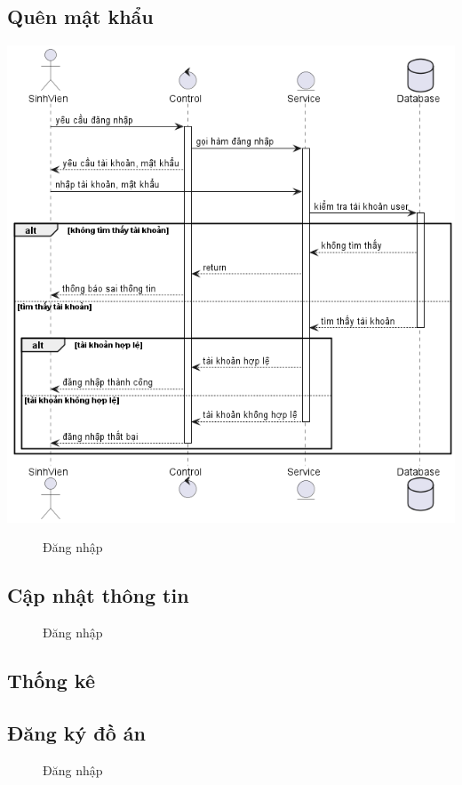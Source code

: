 \subsection{Quên mật khẩu}
  \begin{center}
    \includegraphics[width=1.1\textwidth]{image/sequence/login.png}
    \begin{figure}
      \centering
      \caption{Đăng nhập}
    \end{figure}
  \end{center}
\subsection{Cập nhật thông tin}
  \begin{center}
    \begin{figure}
      \centering
      \caption{Đăng nhập}
    \end{figure}
  \end{center}

\subsection{Thống kê}

\subsection{Đăng ký đồ án}
  \begin{center}
    \begin{figure}
      \centering
      \caption{Đăng nhập}
    \end{figure}
  \end{center}

